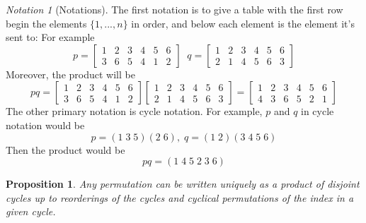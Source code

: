\documentclass[12pt]{article}
\newtheorem{prop}[thm]{Proposition}
\theoremstyle{definition}
\theoremstyle{remark}
\newtheorem{nota}[thm]{Notation}
\numberwithin{equation}{section}
\begin{document}
\vspace{15pt}

\begin{nota}[Notations]
        The first notation is to give a table with the first row begin the elements $\{1,...,n\}$ in order, and below each element is the element it's sent to: For example \begin{equation}
                p = \begin{bmatrix} 1 & 2 & 3 & 4 & 5 & 6 \\ 3 & 6 & 5 & 4 & 1 & 2 \end{bmatrix} \;\;q = \begin{bmatrix} 1 & 2 & 3 & 4 & 5 & 6 \\ 2 & 1 & 4 & 5 & 6 & 3 \end{bmatrix}
        \end{equation}
        Moreover, the product will be \begin{equation}
                pq = \begin{bmatrix} 1 & 2 & 3 & 4 & 5 & 6 \\ 3 & 6 & 5 & 4 & 1 & 2 \end{bmatrix}\begin{bmatrix} 1 & 2 & 3 & 4 & 5 & 6 \\ 2 & 1 & 4 & 5 & 6 & 3 \end{bmatrix} = \begin{bmatrix} 1 & 2 & 3 & 4 & 5 & 6 \\ 4 & 3 & 6 & 5 & 2 & 1 \end{bmatrix}
        \end{equation}
        The other primary notation is cycle notation. For example, $p$ and $q$ in cycle notation would be \begin{equation}
                p = (1\;3\;5)(2\;6), \; q = (1\;2)(3\;4\;5\;6)
        \end{equation}
        Then the product would be \begin{equation}
                pq = (1\;4\;5\;2\;3\;6)
        \end{equation}
\end{nota}

\vspace{15pt}

\begin{prop}
        Any permutation can be written uniquely as a product of disjoint cycles up to reorderings of the cycles and cyclical permutations of the index in a given cycle. 
\end{prop}
\end{document}
